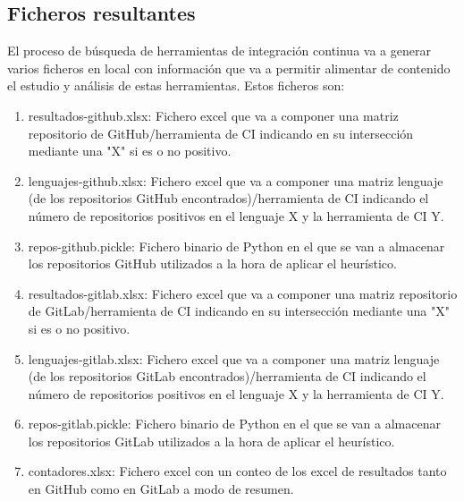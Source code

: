 \subsection{Ficheros resultantes}
El proceso de búsqueda de herramientas de integración continua va a generar varios ficheros en local con información que va a permitir alimentar de contenido el estudio y análisis de estas herramientas. Estos ficheros son:
\begin{enumerate}
    \item resultados-github.xlsx: Fichero excel que va a componer una matriz repositorio de GitHub/herramienta de CI indicando en su intersección mediante una "X" si es o no positivo.
    \item lenguajes-github.xlsx: Fichero excel que va a componer una matriz lenguaje (de los repositorios GitHub encontrados)/herramienta de CI indicando el número de repositorios positivos en el lenguaje X y la herramienta de CI Y.
    \item repos-github.pickle: Fichero binario de Python en el que se van a almacenar los repositorios GitHub utilizados a la hora de aplicar el heurístico.
    \item resultados-gitlab.xlsx: Fichero excel que va a componer una matriz repositorio de GitLab/herramienta de CI indicando en su intersección mediante una "X" si es o no positivo.
    \item lenguajes-gitlab.xlsx: Fichero excel que va a componer una matriz lenguaje (de los repositorios GitLab encontrados)/herramienta de CI indicando el número de repositorios positivos en el lenguaje X y la herramienta de CI Y.
    \item repos-gitlab.pickle: Fichero binario de Python en el que se van a almacenar los repositorios GitLab utilizados a la hora de aplicar el heurístico.
    \item contadores.xlsx: Fichero excel con un conteo de los excel de resultados tanto en GitHub como en GitLab a modo de resumen.
\end{enumerate}

